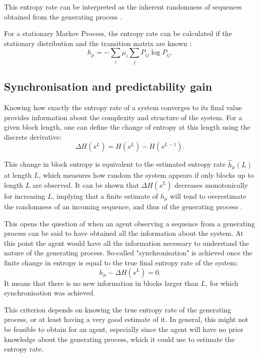 \documentclass[12pt,a4paper]{article}
\begin{document}
This entropy rate can be interpreted as the inherent randomness of sequences obtained from the generating process \autocite{crutchfield2003regularities}.

For a stationary Markov Process, the entropy rate can be calculated if the stationary distribution and the transition matrix are known \autocite{cover1999elements}:
\begin{equation}
    \label{eq:entropy_rate_MP}
    h_\mu = -\sum_i \mu_i \sum_j P_{ij} \log P_{ij}.
\end{equation}

\subsection{Synchronisation and predictability gain} \label{ssec:synch_predgain}
Knowing how exactly the entropy rate of a system converges to its final value provides information about the complexity and structure of the system.
For a given block length, one can define the change of entropy at this length using the discrete derivative:
\begin{equation}
    \label{eq:entropy_change}
    \Delta H(s^L) = H(s^L) - H(s^{L-1}).
\end{equation}

This change in block entropy is equivalent to the estimated entropy rate $\hat{h}_\mu(L)$ at length $L$, which measures how random the system appears if only blocks up to length $L$ are observed.
It can be shown that $\Delta H(s^L)$ decreases monotonically for increasing $L$, implying that a finite estimate of $h_\mu$ will tend to overestimate the randomness of an incoming sequence, and thus of the generating process \autocite{crutchfield2003regularities}.

This opens the question of when an agent observing a sequence from a generating process can be said to have obtained all the information about the system.
At this point the agent would have all the information necessary to understand the nature of the generating process.
So-called "synchronisation" is achieved once the finite change in entropy is equal to the true final entropy rate of the system:
\begin{equation}
    \label{eq:synchronisation_equality}
    h_\mu - \Delta H(s^L) = 0.
\end{equation}
It means that there is no new information in blocks larger than $L$, for which synchronisation was achieved.

This criterion depends on knowing the true entropy rate of the generating process, or at least having a very good estimate of it.
In general, this might not be feasible to obtain for an agent, especially since the agent will have no prior knowledge about the generating process, which it could use to estimate the entropy rate.
\end{document}
